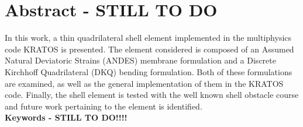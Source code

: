 
\chapter*{Abstract - STILL TO DO}
\label{cha:abstract}

In this work, a thin quadrilateral shell element implemented in the multiphysics code KRATOS is presented. The element considered is composed of an Assumed Natural Deviatoric Strains (ANDES) membrane formulation and a Discrete Kirchhoff Quadrilateral (DKQ) bending formulation. Both of these formulations are examined, as well as the general implementation of them in the KRATOS code. Finally, the shell element is tested with the well known shell obstacle course and future work pertaining to the element is identified.\\


{\textcolor{gray75}{\Huge\bfseries{Keywords - STILL TO DO!!!!}}}

\keywords

\newpage